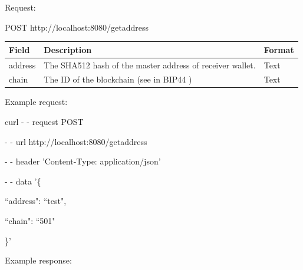 Request:

\begin{framed}
    POST http://localhost:8080/getaddress
\end{framed}

\begin{tabular}{m{3cm}  m{9cm} m{2.6cm}}
    \toprule
    Field & Description & Format                                            \\ 
    \midrule
    address & The SHA512 hash of the master address of receiver wallet. & Text   \\ 
    chain   & The ID of the blockchain (see in BIP44 \cite{bip44}) & Text    \\ 
    \bottomrule
\end{tabular}
\bigskip

Example request:

\begin{framed}
\hspace*{13mm}    curl - - request POST \par
\hspace*{13mm}        - - url http://localhost:8080/getaddress \par
\hspace*{13mm}        - - header 'Content-Type: application/json' \par
\hspace*{13mm}        - - data '\{ \par
\hspace*{20mm}                ``address": ``test", \par
\hspace*{20mm}                ``chain": ``501" \par
\hspace*{20mm}            \}' \par
\end{framed}


Example response:

